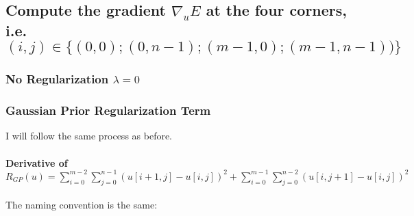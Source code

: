 \documentclass{report}
\begin{document}
		\subsection{Compute the gradient $\nabla_u E$ at the four corners, \\ i.e. $(i,j) \in \{ (0,0); (0,n-1);(m-1,0);(m-1,n-1)) \}$}
		\startsubsection
			\subsubsection{No Regularization $\lambda = 0$}
			\startsubsection
			\closesection
			\subsubsection{Gaussian Prior Regularization Term}
			\startsubsection
				I will follow the same process as before.
				\vspace{-0.4cm} \paragraph{Derivative of $R_{GP}(u) = \sum_{i=0}^{m-2} \sum_{j=0}^{n-1} ( u[i+1,j] - u[i,j] )^2 + \sum_{i=0}^{m-1} \sum_{j=0}^{n-2} ( u[i,j+1] - u[i,j] )^2$}
				\startsubsection
					\vspace{0.2cm} The naming convention is the same:
\end{document}

